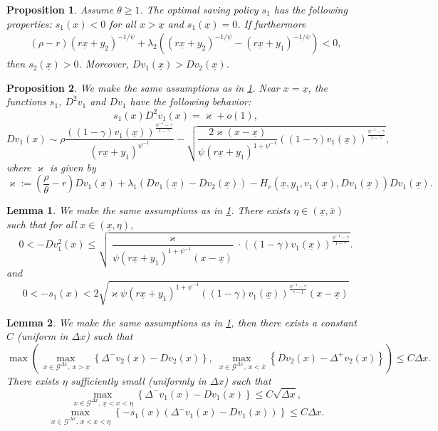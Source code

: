 \documentclass[10pt,a4paper]{amsart}
\newtheorem{proposition}{Proposition}
\newtheorem{lemma}{Lemma}
\newcommand{\D}{\Delta}
\newcommand{\beq}{\begin{equation}}
\newcommand{\eeq}{\end{equation}}
\newcommand{\g}{\gamma}
\newcommand{\lc}{\left(}
\newcommand{\p}{\psi}
\newcommand{\rc}{\right)}
\newcommand{\ux}{{\underline x}}
\begin{document}
\begin{proposition}\label{Prop: saving}
Assume $\theta \geq 1$. The optimal saving policy $s_1$ has the following properties: $s_1(x)< 0$ for all $x> \ux$ and $s_1(\ux)=0$. If furthermore
\beq\label{rho-r2}
\begin{aligned}
\lc \rho-r\rc(r\ux+y_2)^{-1/\psi}+\lambda_2\lc (r\ux+y_2)^{-1/\psi}-(r\ux+y_1)^{-1/\psi}\rc< 0,
\end{aligned}
\eeq
then $s_2(\ux)>0$. Moreover, $Dv_1(\ux)>Dv_2(\ux)$. 
\end{proposition}

\begin{proposition}\label{Prop: Dv1 ux}
We make the same assumptions as in \cref{Prop: saving}. Near $x=\ux$, the functions $s_1$, $D^2v_1$ and $Dv_1$ have the following behavior: 
\beq\label{Eq: s1D2v1 ux}
s_1(x)D^2v_1(x)= \varkappa+o(1),
\eeq
\beq\label{Eq: Dv1 ux}
Dv_1(x)\sim \rho\frac{((1-\g)v_1(\ux))^{\frac{\p^{-1}-\g}{1-\g}}}{ (r\ux+y_1)^{\p^{-1}}}-\sqrt{\frac{2\varkappa(x-\ux)}{\p \lc r\ux+y_1\rc^{1+\p^{-1}}} ((1-\g)v_1(\ux))^{\frac{\p^{-1}-\g}{1-\g}}},
\eeq
where $\varkappa$ is given by
\beq\label{Eq: varkappa}
\varkappa:=\lc \frac{\rho}{\theta}-r\rc Dv_1(\ux)+\lambda_1(Dv_1(\ux)-Dv_2(\ux))-H_v(\ux,y_1,v_1(\ux),Dv_1(\ux))Dv_1(\ux).
\eeq
\end{proposition}

\begin{lemma}\label{Prop: D2v1 ux}
We make the same assumptions as in \cref{Prop: saving}. There exists $\eta\in (\ux,\bar{x})$ such that for all $x\in (\ux,\eta)$, 
\beq\label{Eq: -D2v1 bound}
0<-Dv^2_1(x)\leq \sqrt{\frac{\varkappa}{\p \lc r\ux+y_1\rc^{1+\p^{-1}}(x-\ux)}\cdot ((1-\g)v_1(\ux))^{\frac{\p^{-1}-\g}{1-\g}}}.
\eeq
and 
\beq\label{Eq: -s1 bound}
0<-s_1(x)<2\sqrt{\varkappa \p \lc r\ux+y_1\rc^{1+\p^{-1}}((1-\g)v_1(\ux))^{\frac{\p^{-1}-\g}{\g-1}}(x-\ux)}
\eeq

\end{lemma}

\begin{lemma}\label{Lemma: error FD}
We make the same assumptions as in \cref{Prop: saving}, then there exists a constant $C$ (uniform in $\D x$) such that
\beq\label{Eq: FD erro v2}
\max\lc\max_{\,x\in \mathcal{G}^{\D x},\,x>\ux}\left\{\D^-{v_{2}(x)}-Dv_{2}(x)\right\},\,\max_{\,x\in \mathcal{G}^{\D x},\,x<\bar{x}}\left\{Dv_{2}(x)-\D^+{v_{2}(x)}\right\}\rc\leq C\D x.
\eeq
There exists $\eta$ sufficiently small (uniformly in $\D x$) such that
\beq\label{Eq: FD boundDx}
\max_{\,x\in \mathcal{G}^{\D x},\,\ux<x<\eta}\left\{\D^-{v_{1}(x)}-Dv_{1}(x)\right\}\leq C\sqrt{\D x},
\eeq
\beq\label{Eq: s1FD boundDx}
\max_{\,x\in \mathcal{G}^{\D x},\,\ux<x<\eta}\left\{-s_1(x)\lc\D^-{v_{1}(x)}-Dv_{1}(x)\rc\right\}\leq C\D x.
\eeq
\end{lemma}
\end{document}
